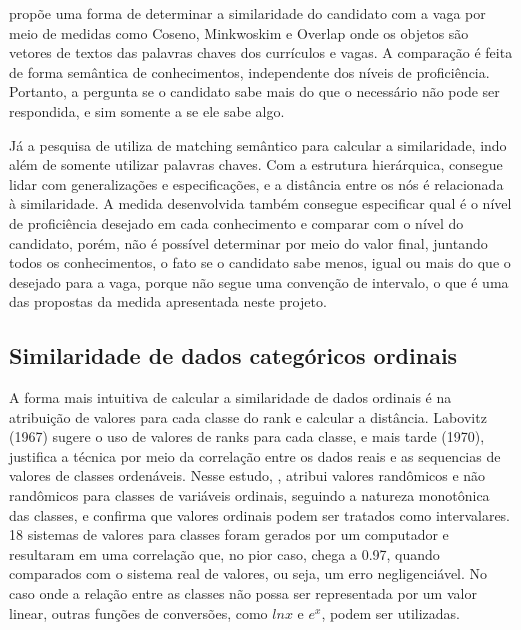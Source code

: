 \documentclass[preprint,12pt]{elsarticle}
\begin{document}
\cite{improve-ranking-candidates-2009} propõe uma forma de determinar a similaridade do candidato com a vaga por meio de medidas como Coseno, Minkwoskim e Overlap onde os objetos são vetores de textos das palavras chaves dos currículos e vagas. A comparação é feita de forma semântica de conhecimentos, independente dos níveis de proficiência. Portanto, a pergunta se o candidato sabe mais do que o necessário não pode ser respondida, e sim somente a se ele sabe algo.

Já a pesquisa de \cite{impact-semantic-web-2005} utiliza de matching semântico para calcular a similaridade, indo além de somente utilizar palavras chaves. Com a estrutura hierárquica, consegue lidar com generalizações e especificações, e a distância entre os nós é relacionada à similaridade. A medida desenvolvida também consegue especificar qual é o nível de proficiência desejado em cada conhecimento e comparar com o nível do candidato, porém, não é possível determinar por meio do valor final, juntando todos os conhecimentos, o fato se o candidato sabe menos, igual ou mais do que o desejado para a vaga, porque não segue uma convenção de intervalo, o que é uma das propostas da medida apresentada neste projeto.


\subsection{Similaridade de dados categóricos ordinais}
\label{ssec:sim-ordinal-data}

A forma mais intuitiva de calcular a similaridade de dados ordinais é na atribuição de valores para cada classe do rank e calcular a distância. Labovitz (1967) \cite{labovitz-1967-observation-statistics} sugere o uso de valores de ranks para cada classe, e mais tarde (1970), justifica a técnica por meio da correlação entre os dados reais e as sequencias de valores de classes ordenáveis. Nesse estudo, \cite{assignment-rank-order-1970}, atribui valores randômicos e não randômicos para classes de variáveis ordinais, seguindo a natureza monotônica das classes, e confirma que valores ordinais podem ser tratados como intervalares. 18 sistemas de valores para classes foram gerados por um computador e resultaram em uma correlação que, no pior caso, chega a 0.97, quando comparados com o sistema real de valores, ou seja, um erro negligenciável. No caso onde a relação entre as classes não possa ser representada por um valor linear, outras funções de conversões, como $ln x$ e $e^x$, podem ser utilizadas.
\end{document}
